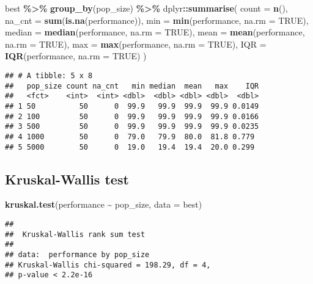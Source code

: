 \documentclass[
]{book}
\newenvironment{Shaded}{\begin{snugshade}}{\end{snugshade}}
\newcommand{\AttributeTok}[1]{\textcolor[rgb]{0.13,0.29,0.53}{#1}}
\newcommand{\ConstantTok}[1]{\textcolor[rgb]{0.56,0.35,0.01}{#1}}
\newcommand{\FunctionTok}[1]{\textcolor[rgb]{0.13,0.29,0.53}{\textbf{#1}}}
\newcommand{\NormalTok}[1]{#1}
\newcommand{\SpecialCharTok}[1]{\textcolor[rgb]{0.81,0.36,0.00}{\textbf{#1}}}
\begin{document}
\begin{Shaded}
\begin{Highlighting}[]
\NormalTok{best }\SpecialCharTok{\%\textgreater{}\%}
  \FunctionTok{group\_by}\NormalTok{(pop\_size) }\SpecialCharTok{\%\textgreater{}\%}
\NormalTok{  dplyr}\SpecialCharTok{::}\FunctionTok{summarise}\NormalTok{(}
    \AttributeTok{count =} \FunctionTok{n}\NormalTok{(),}
    \AttributeTok{na\_cnt =} \FunctionTok{sum}\NormalTok{(}\FunctionTok{is.na}\NormalTok{(performance)),}
    \AttributeTok{min =} \FunctionTok{min}\NormalTok{(performance, }\AttributeTok{na.rm =} \ConstantTok{TRUE}\NormalTok{),}
    \AttributeTok{median =} \FunctionTok{median}\NormalTok{(performance, }\AttributeTok{na.rm =} \ConstantTok{TRUE}\NormalTok{),}
    \AttributeTok{mean =} \FunctionTok{mean}\NormalTok{(performance, }\AttributeTok{na.rm =} \ConstantTok{TRUE}\NormalTok{),}
    \AttributeTok{max =} \FunctionTok{max}\NormalTok{(performance, }\AttributeTok{na.rm =} \ConstantTok{TRUE}\NormalTok{),}
    \AttributeTok{IQR =} \FunctionTok{IQR}\NormalTok{(performance, }\AttributeTok{na.rm =} \ConstantTok{TRUE}\NormalTok{)}
\NormalTok{  )}
\end{Highlighting}
\end{Shaded}

\begin{verbatim}
## # A tibble: 5 x 8
##   pop_size count na_cnt   min median  mean   max    IQR
##   <fct>    <int>  <int> <dbl>  <dbl> <dbl> <dbl>  <dbl>
## 1 50          50      0  99.9   99.9  99.9  99.9 0.0149
## 2 100         50      0  99.9   99.9  99.9  99.9 0.0166
## 3 500         50      0  99.9   99.9  99.9  99.9 0.0235
## 4 1000        50      0  79.0   79.9  80.0  81.8 0.779 
## 5 5000        50      0  19.0   19.4  19.4  20.0 0.299
\end{verbatim}

\hypertarget{kruskal-wallis-test}{%
\subsection{Kruskal-Wallis test}\label{kruskal-wallis-test}}

\begin{Shaded}
\begin{Highlighting}[]
\FunctionTok{kruskal.test}\NormalTok{(performance }\SpecialCharTok{\textasciitilde{}}\NormalTok{ pop\_size, }\AttributeTok{data =}\NormalTok{ best)}
\end{Highlighting}
\end{Shaded}

\begin{verbatim}
## 
##  Kruskal-Wallis rank sum test
## 
## data:  performance by pop_size
## Kruskal-Wallis chi-squared = 198.29, df = 4,
## p-value < 2.2e-16
\end{verbatim}
\end{document}

